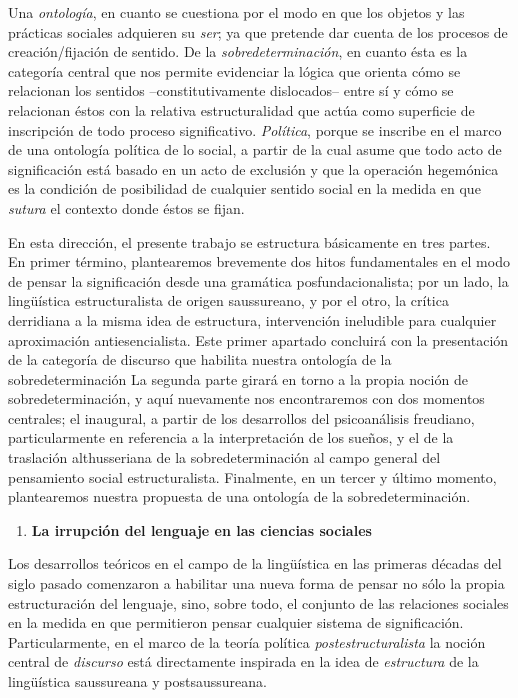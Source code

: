 \documentclass{book}
\begin{document}
Una \emph{ontología}, en cuanto se cuestiona por el modo en que los
objetos y las prácticas sociales adquieren su \emph{ser}; ya que
pretende dar cuenta de los procesos de creación/fijación de sentido. De
la \emph{sobredeterminación}, en cuanto ésta es la categoría central que
nos permite evidenciar la lógica que orienta cómo se relacionan los
sentidos --constitutivamente dislocados-- entre sí y cómo se relacionan
éstos con la relativa estructuralidad que actúa como superficie de
inscripción de todo proceso significativo. \emph{Política}, porque se
inscribe en el marco de una ontología política de lo social, a partir de
la cual asume que todo acto de significación está basado en un acto de
exclusión y que la operación hegemónica es la condición de posibilidad
de cualquier sentido social en la medida en que \emph{sutura} el
contexto donde éstos se fijan.

En esta dirección, el presente trabajo se estructura básicamente en tres
partes. En primer término, plantearemos brevemente dos hitos
fundamentales en el modo de pensar la significación desde una gramática
posfundacionalista; por un lado, la lingüística estructuralista de
origen saussureano, y por el otro, la crítica derridiana a la misma idea
de estructura, intervención ineludible para cualquier aproximación
antiesencialista. Este primer apartado concluirá con la presentación de
la categoría de discurso que habilita nuestra ontología de la
sobredeterminación La segunda parte girará en torno a la propia noción
de sobredeterminación, y aquí nuevamente nos encontraremos con dos
momentos centrales; el inaugural, a partir de los desarrollos del
psicoanálisis freudiano, particularmente en referencia a la
interpretación de los sueños, y el de la traslación althusseriana de la
sobredeterminación al campo general del pensamiento social
estructuralista. Finalmente, en un tercer y último momento, plantearemos
nuestra propuesta de una ontología de la sobredeterminación.

\begin{enumerate}
\def\labelenumi{\arabic{enumi}.}
\setcounter{enumi}{1}
\item
  \textbf{La irrupción del lenguaje en las ciencias sociales}
\end{enumerate}

Los desarrollos teóricos en el campo de la lingüística en las primeras
décadas del siglo pasado comenzaron a habilitar una nueva forma de
pensar no sólo la propia estructuración del lenguaje, sino, sobre todo,
el conjunto de las relaciones sociales en la medida en que permitieron
pensar cualquier sistema de significación. Particularmente, en el marco
de la teoría política \emph{postestructuralista} la noción central de
\emph{discurso} está directamente inspirada en la idea de
\emph{estructura} de la lingüística saussureana y postsaussureana.
\end{document}
